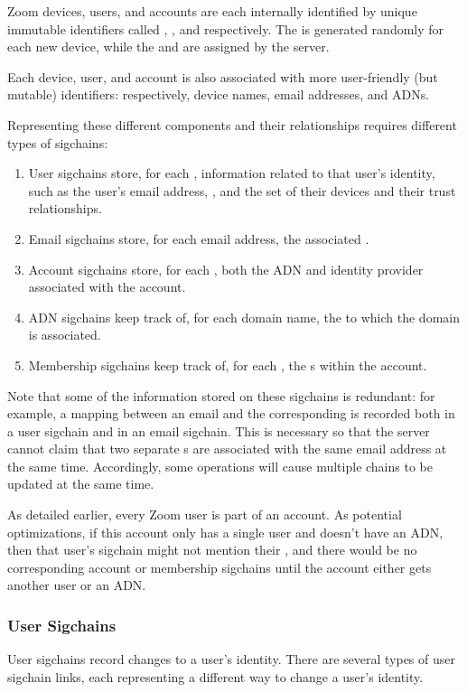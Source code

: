 Zoom devices, users, and accounts are each internally identified by unique immutable identifiers
called \deviceid, \userID, and \accountID respectively. The \deviceid is generated randomly for each
new device, while the \userID and \accountID are assigned by the server.

Each device, user, and account is also associated with more user-friendly (but mutable) identifiers:
respectively, device names, email addresses, and ADNs.

Representing these different components and their relationships requires different types of
sigchains:

\begin{enumerate}
\item User sigchains store, for each \userID, information related to that user's identity, such as
    the user's email address, \accountID, and the set of their devices and their trust
    relationships.
\item Email sigchains store, for each email address, the associated \userID.
\item Account sigchains store, for each \accountID, both the ADN and identity provider associated
    with the account.
\item ADN sigchains keep track of, for each domain name, the \accountID to which the domain is
    associated.
\item Membership sigchains keep track of, for each \accountID, the {\userID}s within the account.
\end{enumerate}

Note that some of the information stored on these sigchains is redundant: for example, a mapping
between an email and the corresponding \userID is recorded both in a user sigchain and in an email
sigchain. This is necessary so that the server cannot claim that two separate {\userID}s are
associated with the same email address at the same time. Accordingly, some operations will cause
multiple chains to be updated at the same time.

As detailed earlier, every Zoom user is part of an account. As potential optimizations, if this
account only has a single user and doesn't have an ADN, then that user's sigchain might not mention
their \accountID, and there would be no corresponding account or membership sigchains until the
account either gets another user or an ADN.

\subsubsection{User Sigchains}
 \label{subsubsec:usersigchains}
User sigchains record changes to a user's identity. There are several types of user sigchain links,
each representing a different way to change a user's identity.

